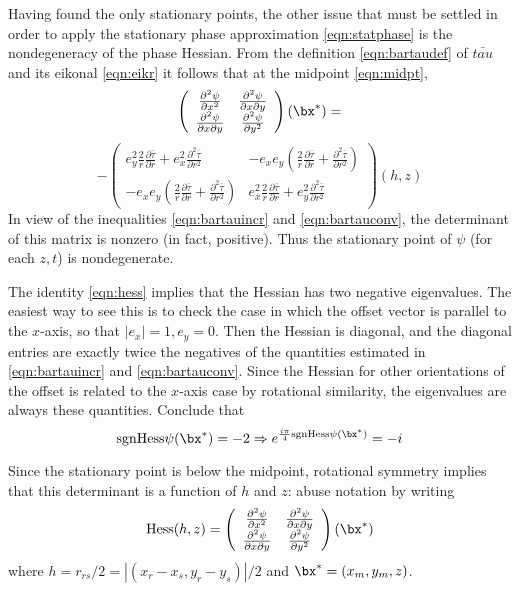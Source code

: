 Having found the only stationary points, the other issue that must be settled in order to apply the stationary phase approximation \ref{eqn:statphase} is the nondegeneracy of the phase Hessian. From the definition \ref{eqn:bartaudef} of $\bar{tau}$ and its eikonal \ref{eqn:eikr} it follows that at the midpoint \ref{eqn:midpt}, 
\[
\left(
\begin{array}{cc}
\frac{\partial^2 \psi}{\partial x^2} & \frac{\partial^2 \psi}{\partial x \partial y}\\
\frac{\partial^2 \psi}{\partial x \partial y} & \frac{\partial^2 \psi}{\partial y^2} 
\end{array}
\right) (\bx^*)
=
\]
\begin{equation}
\label{eqn:hess}
-\left(
\begin{array}{cc} 
e_y^2\frac{2}{r}\frac{\partial \bar{\tau}}{\partial r} + e_x^2\frac{\partial^2 \bar{\tau}}{\partial r^2} & 
-e_xe_y\left( \frac{2}{r}\frac{\partial \bar{\tau}}{\partial r} + \frac{\partial^2 \bar{\tau}}{\partial r^2}\right) \\
-e_xe_y\left( \frac{2}{r}\frac{\partial \bar{\tau}}{\partial r} + \frac{\partial^2 \bar{\tau}}{\partial r^2} \right) &
e_x^2\frac{2}{r}\frac{\partial \bar{\tau}}{\partial r} + e_y^2\frac{\partial^2 \bar{\tau}}{\partial r^2}
\end{array}
\right) (h,z)
\end{equation}
In view of the inequalities \ref{eqn:bartauincr} and \ref{eqn:bartauconv}, the determinant of this matrix is nonzero (in fact, positive). Thus the stationary point of $\psi$ (for each $z,t$) is nondegenerate.

The identity \ref{eqn:hess} implies that the Hessian has two negative eigenvalues. The easiest way to see this is to check the case in which the offset vector is parallel to the $x$-axis, so that $|e_x|=1, e_y=0$. Then the Hessian is diagonal, and the diagonal entries are exactly twice the negatives of the quantities estimated in \ref{eqn:bartauincr} and \ref{eqn:bartauconv}. Since the Hessian for other orientations of the offset is related to the $x$-axis case by rotational similarity, the eigenvalues are always these quantities. Conclude that
\begin{equation}
\label{eqn:signat}
{\rm sgn} {\rm Hess}\psi(\bx^*) = -2 \Rightarrow e^{\frac{i \pi}{4} {\rm sgn} {\rm Hess}\psi(\bx^*)} = -i
\end{equation}

Since the stationary point is below the midpoint, rotational symmetry implies that this determinant is a function of $h$ and $z$: abuse notation by writing
\begin{equation}
\label{eqn:hessdef}
{\rm Hess}(h,z) = \left(
\begin{array}{cc}
\frac{\partial^2 \psi}{\partial x^2} & \frac{\partial^2 \psi}{\partial x \partial y}\\
\frac{\partial^2 \psi}{\partial x \partial y} & \frac{\partial^2 \psi}{\partial y^2} 
\end{array}
\right) (\bx^*)
\end{equation}
where $h=r_{rs}/2 = |(x_r-x_s,y_r-y_s)|/2$ and $\bx^*=(x_m,y_m,z)$.

